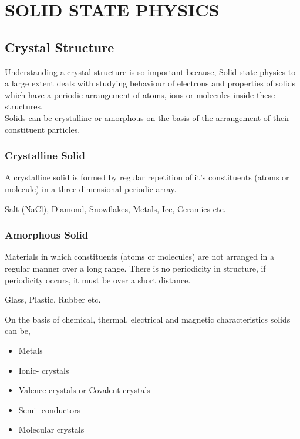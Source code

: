 \chapter{SOLID STATE PHYSICS}
\section{Crystal Structure}
Understanding a crystal structure is so important because,  Solid state physics to a large extent deals with studying behaviour of electrons and properties of solids which have a periodic arrangement of atoms, ions or molecules inside these structures.\\
	 Solids can be crystalline or amorphous on the basis of the arrangement of their constituent particles.
	 \subsection{Crystalline Solid}
	 A crystalline solid is formed by regular repetition of it's constituents (atoms or molecule) in a three dimensional periodic array. 
	 \begin{example}
	 Salt (NaCl), Diamond, Snowflakes, Metals, Ice, Ceramics etc.	
	 \end{example}  
	 \subsection{Amorphous Solid}
	 Materials in which constituents (atoms or molecules) are not arranged in a regular manner over a long range. There is no periodicity in structure, if periodicity occurs, it must be over a short distance.  
	 \begin{example}
	 	 Glass, Plastic, Rubber etc.
	 \end{example}
$\left. \right. $ \\
On the basis of chemical, thermal, electrical and magnetic characteristics solids can be, 
	\begin{itemize}
		\item Metals
		\item Ionic- crystals
		\item Valence crystals or Covalent crystals
		\item Semi- conductors
		\item Molecular crystals
	\end{itemize} 


